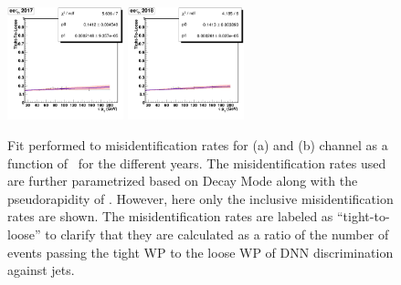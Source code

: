 \begin{figure}[htbp]
{    \includegraphics[width=0.3\textwidth]{plots/chapter7/Fake/FR/EET2017.png}
    \includegraphics[width=0.3\textwidth]{plots/chapter7/Fake/FR/EET2018.png}
  }
  \caption{Fit performed to \tauh misidentification rates for \Hmuhad (a) and \Hehad (b) channel as a function of \tauh \pt\, for the different years. The misidentification rates used are further parametrized based on \tauh Decay Mode along with the pseudorapidity of \tauh. However, here only the inclusive misidentification rates are shown. The misidentification rates are labeled as ``tight-to-loose'' to clarify that they are calculated as a ratio of the number of events passing the tight WP to the loose WP of DNN discrimination against jets.}
  \label{fig:fakerate_tauh}
\end{figure}

